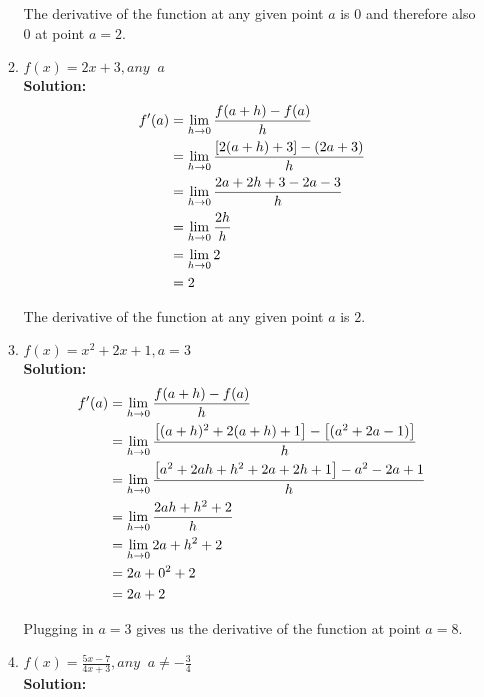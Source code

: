 \documentclass[a4paper]{article}
\begin{document}
\begin{enumerate}
\begin{enumerate}
The derivative of the function at any given point $a$ is $0$ and therefore also 0 at point $a = 2$.\\	
	
	\item $f(x) = 2x + 3, any \; \; a$\\
	\textbf{Solution:}\\
	
\begin{align}
	f'(a) &= \lim_{h \to 0} \frac{f(a + h) - f(a)}{h}\notag\\
	&= \lim_{h \to 0} \frac{\left[ 2(a+h) + 3\right] - (2a + 3)}{h}\notag\\
	&= \lim_{h \to 0} \frac{2a + 2h + 3 - 2a - 3}{h}\notag\\
	&= \lim_{h \to 0} \frac{2h}{h}\notag\\
	&= \lim_{h \to 0} 2\notag\\
	&= 2\notag
\end{align}		
	
The derivative of the function at any given point $a$ is $2$.\\	
	
	
	\item $f(x) = x^2 + 2x + 1, a = 3$\\
	\textbf{Solution:}\\
	
\begin{align}
	f'(a) &= \lim_{h \to 0} \frac{f(a + h) - f(a)}{h}\notag\\
	&= \lim_{h \to 0} \frac{\left[ (a+h)^2 + 2(a+h) + 1\right] - \left[ (a^2 + 2a - 1) \right]}{h}\notag\\
	&= \lim_{h \to 0} \frac{\left[ a^2 + 2ah + h^2 + 2a + 2h + 1\right] - a^2 - 2a + 1}{h}\notag\\
	&= \lim_{h \to 0} \frac{2ah + h^2 + 2}{h}\notag\\
	&= \lim_{h \to 0} 2a + h^2 + 2\notag\\
	&= 2a + 0^2 + 2\notag\\
	&= 2a + 2\notag
\end{align}	
	
Plugging in $a = 3$ gives us the derivative of the function at point $a = 8$.\\
	
	
	\item $f(x) = \frac{5x - 7}{4x + 3}, any \; \; a \neq -\frac{3}{4}$\\
	\textbf{Solution:}\\
	

\end{enumerate}
\end{enumerate}
\end{document}

